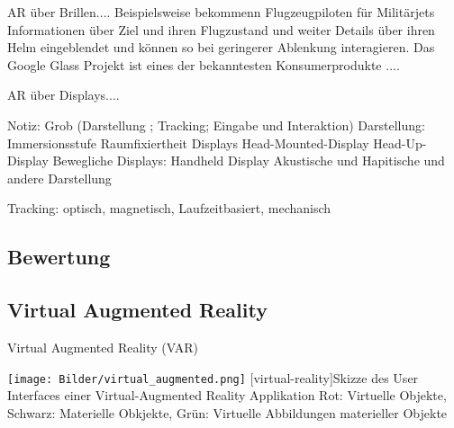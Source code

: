 \documentclass[12pt,a4paper,bibliography=totocnumbered,listof=totocnumbered]{scrartcl}
\begin{document}
AR über Brillen.... 
Beispielsweise bekommenn Flugzeugpiloten für Militärjets Informationen über Ziel und ihren Flugzustand und weiter Details über ihren Helm eingeblendet und können so bei geringerer Ablenkung interagieren. 
Das Google Glass Projekt ist eines der bekanntesten Konsumerprodukte ....


AR über Displays....



Notiz: Grob (Darstellung ; Tracking; Eingabe und Interaktion)
Darstellung:
Immersionsstufe
Raumfixiertheit
Displays
Head-Mounted-Display
Head-Up-Display
Bewegliche Displays: Handheld Display
Akustische und Hapitische und andere Darstellung

Tracking: optisch, magnetisch, Laufzeitbasiert, mechanisch
\subsection{Bewertung}
\subsection{Virtual Augmented Reality}
Virtual Augmented Reality (\ac{VAR})

\begin{minipage}{\linewidth}
\vspace{1em}
	\centering
	\texttt{[image: Bilder/virtual\_augmented.png]}
	[virtual-reality]{Skizze des User Interfaces einer Virtual-Augmented Reality Applikation\newline
	Rot: Virtuelle Objekte, Schwarz: Materielle Obkjekte, Grün: Virtuelle Abbildungen materieller Objekte}
	\label{fig:virtual_augmented_reality}
\vspace{1em}

\end{minipage}
\end{document}
